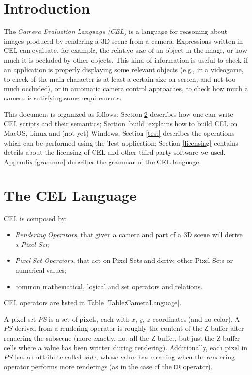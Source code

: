 \section{Introduction}

The \emph{Camera Evaluation Language (CEL)} is a language for reasoning about images produced by rendering a 3D scene from a camera. Expressions written in CEL can evaluate, for example, the relative size of an object in the image, or how much it is occluded by other objects. This kind of information is useful to check if an application is properly displaying some relevant objects (e.g., in a videogame, to check of the main character is at least a certain size on screen, and not too much occluded), or in automatic camera control approaches, to check how much a camera is satisfying some requirements.

This document is organized as follows: Section \ref{language} describes how one can write CEL scripts and their semantics; Section \ref{build} explains how to build CEL on MacOS, Linux and (not yet) Windows; Section \ref{test} describes the operations which can be performed using the Test application; Section \ref{licensing} contains details about the licensing of CEL and other third party software we used. Appendix \ref{grammar} describes the grammar of the CEL language.
	
\section{The CEL Language} \label{language}
	
CEL is composed by:
\begin{itemize}
	\setlength{\itemsep}{2pt}
	\setlength{\parskip}{0pt}
	\setlength{\parsep}{0pt}
	
	\item \emph{Rendering Operators}, that given a camera and part of a 3D scene will derive a \emph{Pixel Set};
	\item \emph{Pixel Set Operators}, that act on Pixel Sets and derive other Pixel Sets or numerical values;
	\item common mathematical, logical and set operators and relations.
\end{itemize}

CEL operators are listed in Table \ref{Table:CameraLanguage}. 

A pixel set $PS$ is a set of pixels, each with $x$, $y$, $z$ coordinates (and no color). A $PS$ derived from a rendering operator is roughly the content of the Z-buffer after rendering the subscene (more exactly, not all the Z-buffer, but just the Z-buffer cells where a value has been written during rendering). Additionally, each pixel in $PS$ has an attribute called $side$, whose value has meaning when the rendering operator performs more renderings (as in the case of the \texttt{CR} operator). 

